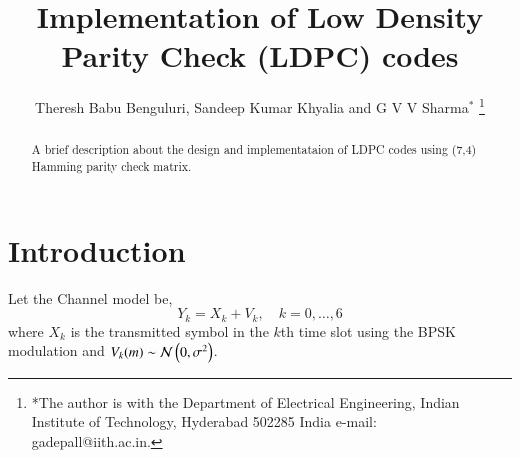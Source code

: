 \documentclass[journal,12pt,twocolumn]{IEEEtran}
\begin{document}


\let\StandardTheFigure\thefigure
\let\StandardTheTable\thetable





\def\putbox#1#2#3{\makebox[0in][l]{\makebox[#1][l]{}\raisebox{\baselineskip}[0in][0in]{\raisebox{#2}[0in][0in]{#3}}}}
     \def\rightbox#1{\makebox[0in][r]{#1}}
     \def\centbox#1{\makebox[0in]{#1}}
     \def\topbox#1{\raisebox{-\baselineskip}[0in][0in]{#1}}
     \def\midbox#1{\raisebox{-0.5\baselineskip}[0in][0in]{#1}}




\title{ 
Implementation of Low Density Parity Check (LDPC) codes
}



\author{Theresh Babu Benguluri, Sandeep Kumar Khyalia and G V V Sharma$^{*}$%
\thanks{*The author is with the Department
of Electrical Engineering, Indian Institute of Technology, Hyderabad
502285 India e-mail:  gadepall@iith.ac.in.}
}


\maketitle

\tableofcontents

%
\begin{abstract}
\boldmath
A brief description about the design and implementataion of LDPC codes using (7,4) Hamming parity check matrix.
\end{abstract}



\section{Introduction}
Let the Channel model be,
\begin{equation}
Y_k= X_k + V_k, \quad k = 0,\dots,6
\end{equation} 
where $X_k$ is the  transmitted symbol in the $k$th time slot using the BPSK modulation and $V_k(m) \sim \mathcal{N}\left(0,\sigma^2\right) $. 
\end{document}
